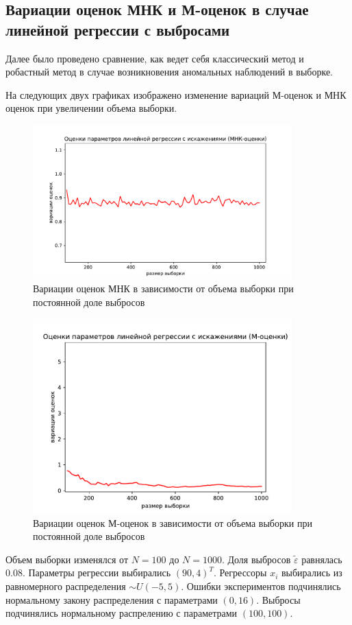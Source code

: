\subsection{Вариации оценок МНК и М-оценок в случае линейной регрессии с выбросами}\label{ss_1}
Далее было проведено сравнение, как ведет себя классический метод и робастный метод в случае возникновения аномальных наблюдений в выборке.

На следующих двух графиках изображено изменение вариаций М-оценок и МНК оценок при увеличении объема выборки.

\begin{figure}[h!]
    \centering
    \includegraphics[width=100mm]{../images/OLS.pdf}
    \caption{Вариации оценок МНК в зависимости от объема выборки при постоянной доле выбросов\label{overflow}}
    \label{pic_ols}
\end{figure}

\begin{figure}[h!]
    \centering
    \includegraphics[width=100mm]{../images/RLM(1).pdf}
    \caption{Вариации оценок М-оценок в зависимости от объема выборки при постоянной доле выбросов\label{overflow}}
\end{figure}

Объем выборки изменялся от $N=100$ до $N=1000$. 
Доля выбросов $\widetilde{\varepsilon}$ равнялась $0.08$. 
Параметры регрессии выбирались $(90, 4)^T$. 
Регрессоры $x_i$ выбирались из равномерного распределения $\sim U(-5,5)$. 
Ошибки экспериментов подчинялись нормальному закону распределения с параметрами $(0, 16)$. Выбросы подчинялись нормальному распрелению с параметрами $(100, 100)$. 

